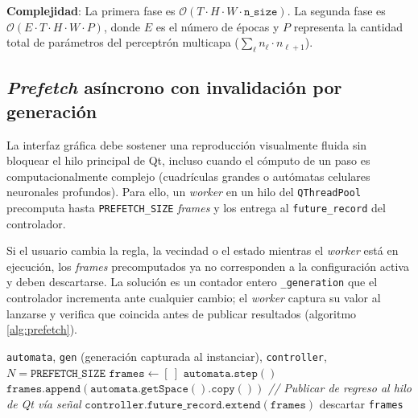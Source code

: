 \textbf{Complejidad}: La primera fase es $\mathcal{O}(T \cdot H \cdot W \cdot \texttt{n\_size})$. La segunda fase es $\mathcal{O}(E \cdot T \cdot H \cdot W \cdot P)$, donde $E$ es el número de épocas y $P$ representa la cantidad total de parámetros del perceptrón multicapa ($\sum_\ell n_\ell \cdot n_{\ell+1}$).

\subsection{\textit{Prefetch} asíncrono con invalidación por generación}

La interfaz gráfica debe sostener una reproducción visualmente fluida sin bloquear el hilo principal de Qt, incluso cuando el cómputo de un paso es computacionalmente complejo (cuadrículas grandes o autómatas celulares neuronales profundos). Para ello, un \textit{worker} en un hilo del \texttt{QThreadPool} precomputa hasta \texttt{PREFETCH\_SIZE} \textit{frames} y los entrega al \texttt{future\_record} del controlador.

Si el usuario cambia la regla, la vecindad o el estado mientras el \textit{worker} está en ejecución, los \textit{frames} precomputados ya no corresponden a la configuración activa y deben descartarse. La solución es un contador entero \texttt{\_generation} que el controlador incrementa ante cualquier cambio; el \textit{worker} captura su valor al lanzarse y verifica que coincida antes de publicar resultados (algoritmo \ref{alg:prefetch}).

\begin{breakablealgorithm}
\caption{PrefetchWorker.run: producción asíncrona de \textit{frames}}
\label{alg:prefetch}
\begin{algorithmic}[1]
\Require \texttt{automata}, \texttt{gen} (generación capturada al instanciar), \texttt{controller}, $N = \texttt{PREFETCH\_SIZE}$
\State $\texttt{frames} \gets [\ ]$
        \State \Return {}
    \EndIf
    \State $\texttt{automata.step}()$
    \State $\texttt{frames.append}(\texttt{automata.getSpace}().\texttt{copy}())$
\EndFor
\Statex
\State \textit{// Publicar de regreso al hilo de Qt vía señal}
    \State $\texttt{controller.future\_record.extend}(\texttt{frames})$
\Else
    \State descartar \texttt{frames}
\EndIf
\end{algorithmic}
\end{breakablealgorithm}

